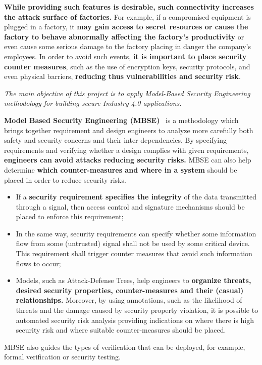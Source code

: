 \textbf{While providing such features is desirable, such connectivity increases the attack surface of factories.} For example, if a compromised equipment is plugged in a factory, it \textbf{may gain access to secret resources or cause the factory to behave abnormally affecting the factory's productivity} or even cause some serious damage to the factory placing in danger the company's employees. In order to avoid such events, \textbf{it is important to place security counter measures}, such as the use of encryption keys, security protocols, and even physical barriers, \textbf{reducing thus vulnerabilities and security risk}. 

\begin{center}
  \emph{The main objective of this project is to apply Model-Based Security Engineering methodology for building secure Industry 4.0 applications.} 
\end{center}

\textbf{Model Based Security Engineering (MBSE)}~\cite{umlsec,secureuml} is a methodology
which brings together requirement and design engineers to analyze more carefully both safety and security concerns and their inter-dependencies. By specifying requirements and verifying whether a design complies with given requirements, \textbf{engineers can avoid attacks reducing security risks.} 
MBSE can also help determine \textbf{which counter-measures and where in a system} should be placed in order to reduce security risks.  
\begin{itemize}
  \item If a \textbf{security requirement specifies the integrity} of the data transmitted through a signal, then access control and signature mechanisms should be placed to enforce this requirement;

  \item In the same way, security requirements can specify whether some information flow from some (untrusted) signal shall not be used by some critical device. This requirement shall trigger counter measures that avoid such information flows to occur;

  \item Models, such as Attack-Defense Trees, help engineers to \textbf{organize threats, desired security properties, counter-measures and their (casual) relationships.} Moreover, by using annotations, such as the likelihood of threats and the damage caused by security property violation, it is possible to automated security risk analysis providing indications on where there is high security risk and where suitable counter-measures should be placed.
\end{itemize}
MBSE also guides the types of verification that can be deployed, for example, formal verification or security testing.

